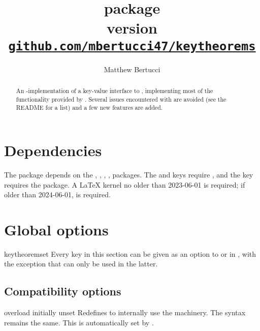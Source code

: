 \documentclass{ltxdoc}
\title{%
  \pkg{keytheorems} package \\[1ex]
  \large version \keythmsversion \\[1ex]
  \href{https://github.com/mbertucci47/keytheorems}
    {\texttt{github.com/mbertucci47/keytheorems}}
  }
\author{Matthew Bertucci}
\begin{document}
\maketitle

\begin{abstract}
An -implementation of a key-value interface to , implementing most of the functionality provided by .
Several issues encountered with  are avoided (see the README for a list) and a few new features are added.
\end{abstract}

\tableofcontents

\section{Dependencies}

The package depends on the , , , ,  packages.
The  and  keys require , and the  key requires the  package.
A \LaTeX{} kernel no older than 2023-06-01 is required; if older than 2024-06-01,  is required.
    
\section{Global options}

\begin{docCommand}{keytheoremset}
  {}
Every key in this section can be given as an option to  or in , with the exception that  can only be used in the latter.
\end{docCommand}

\subsection{Compatibility options}

\begin{docKey}{overload}
  {}
  {initially unset}
Redefines  to internally use the  machinery. The syntax remains the same.
This is automatically set by .
\end{docKey}
\end{document}
